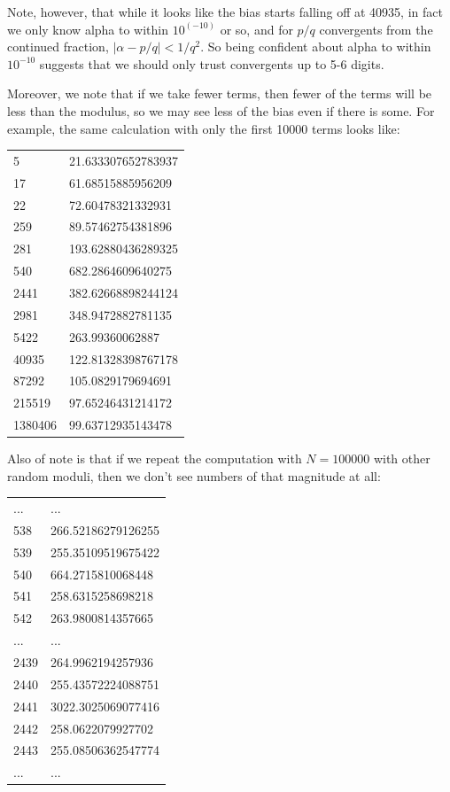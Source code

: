 \documentclass{article}
\theoremstyle{definition}
\theoremstyle{remark}
\numberwithin{equation}{section}
\begin{document}
{Note, however, that while it looks like the bias starts falling off at
40935, in fact we only know alpha to within $10^(-10)$ or so, and for
$p/q$ convergents from the continued fraction,
$|\alpha - p/q| < 1/q^2$.  So being confident about alpha to within
$10^{-10}$ suggests that we should only trust convergents up to 5-6
digits.

Moreover, we note that if we take fewer terms, then fewer of the terms
will be less than the modulus, so we may see less of the bias even if
there is some.  For example, the same calculation with only the first
10000 terms looks like:

\begin{tabular}{ll}
5 & 21.633307652783937\\
17 & 61.68515885956209\\
22 & 72.60478321332931\\
259 & 89.57462754381896\\
281 & 193.62880436289325\\
540 & 682.2864609640275\\
2441 & 382.62668898244124\\
2981 & 348.9472882781135\\
5422 & 263.99360062887\\
40935 & 122.81328398767178\\
87292 & 105.0829179694691\\
215519 & 97.65246431214172\\
1380406 & 99.63712935143478
\end{tabular}

Also of note is that if we repeat the computation with $N=100000$ with
other random moduli, then we don't see numbers of that magnitude at
all:

\begin{tabular}{ll}
...&...\\
538 & 266.52186279126255\\
539 & 255.35109519675422\\
540 & 664.2715810068448\\
541 & 258.6315258698218\\
542 & 263.9800814357665\\
...&...\\
2439 & 264.9962194257936\\
2440 & 255.43572224088751\\
2441 & 3022.3025069077416\\
2442 & 258.0622079927702\\
2443 & 255.08506362547774\\
...&...\\
\end{tabular}

}
\end{document}
